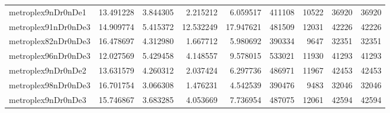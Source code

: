 \begin{longtable}{|l|r|r|r|r|r|r|r|r|}
metroplex9nDr0nDe1 & 13.491228 & 3.844305 & 2.215212 & 6.059517 & 411108 & 10522 & 36920 & 36920 \\
metroplex91nDr0nDe3 & 14.909774 & 5.415372 & 12.532249 & 17.947621 & 481509 & 12031 & 42226 & 42226 \\
metroplex82nDr0nDe3 & 16.478697 & 4.312980 & 1.667712 & 5.980692 & 390334 & 9647 & 32351 & 32351 \\
metroplex96nDr0nDe3 & 12.027569 & 5.429458 & 4.148557 & 9.578015 & 533021 & 11930 & 41293 & 41293 \\
metroplex9nDr0nDe2 & 13.631579 & 4.260312 & 2.037424 & 6.297736 & 486971 & 11967 & 42453 & 42453 \\
metroplex98nDr0nDe3 & 16.701754 & 3.066308 & 1.476231 & 4.542539 & 390476 & 9483 & 32046 & 32046 \\
metroplex9nDr0nDe3 & 15.746867 & 3.683285 & 4.053669 & 7.736954 & 487075 & 12061 & 42594 & 42594 \\
\end{longtable}
